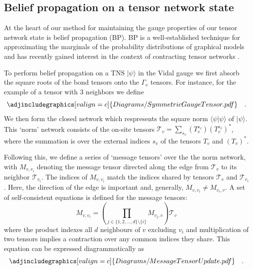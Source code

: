\documentclass[%
 superscriptaddress,
 amsmath,amssymb,
 prx,
]{revtex4-2}
\begin{document}
\subsection*{Belief propagation on a tensor network state}
At the heart of our method for maintaining the gauge properties of our tensor network state is belief propagation (BP). BP is a well-established technique for approximating the marginals of the probability distributions of graphical models \cite{BeliefPropagation1} and has recently gained interest in the context of contracting tensor networks \cite{TensorNetworkBeliefPropagation1,TensorNetworkBeliefPropagation2,TensorNetworkBeliefPropagation3,SimpleUpdateGauging3}. 
\par To perform belief propagation on a TNS $\vert \psi \rangle$ in the Vidal gauge we first absorb the square roots of the bond tensors onto the $\Gamma_{v}$ tensors. For instance, for the example of a tensor with $3$ neighbors we define
\begin{equation}
    \adjincludegraphics[valign=c]{Diagrams/SymmetricGaugeTensor.pdf} \quad.
    \label{Eq:SymmetricTensor}
\end{equation}
We then form the closed network which respresents the square norm $\langle \psi \vert \psi \rangle$ of $\vert \psi \rangle$. This `norm' network consists of the on-site tensors $\mathcal{T}_{v} = \sum_{s_v} (T^{s_v}_{v})(T^{s_v}_{v})^*$, where the summation is over the external indices $s_{v}$ of the tensors $T_{v}$ and $\left( T_{v} \right)^{*}$. 
\par Following this, we define a series of `message tensors' over the the norm network, with $M_{v, v_{i}}$ denoting the message tensor directed along the edge from $\mathcal{T}_{v}$ to its neighbor $\mathcal{T}_{v_{i}}$. The indices of $M_{v, v_{i}}$ match the indices shared by tensors $\mathcal{T}_{v}$ and $\mathcal{T}_{v_{i}}$. Here, the direction of the edge is important and, generally, $M_{v,v_{i}} \neq  M_{v_{i},v}$.
A set of self-consistent equations is defined for the message tensors:
\begin{equation}
    M_{v, v_{i}} = \left(\prod_{j \in \{1, 2, ..., d \} \setminus \{i \}}M_{v_{j}, v}\right)\mathcal{T}_{v}
    \label{Eq:MessageTensorSelfConsistency}
\end{equation}
where the product indexes all $d$ neighbours of $v$ excluding $v_{i}$ and multiplication of two tensors implies a contraction over any common indices they share.
This equation can be expressed diagrammatically as
\begin{equation}
    \adjincludegraphics[valign=c]{Diagrams/MessageTensorUpdate.pdf} \quad.
    \label{Eq:BPEquation}
\end{equation}
\end{document}
